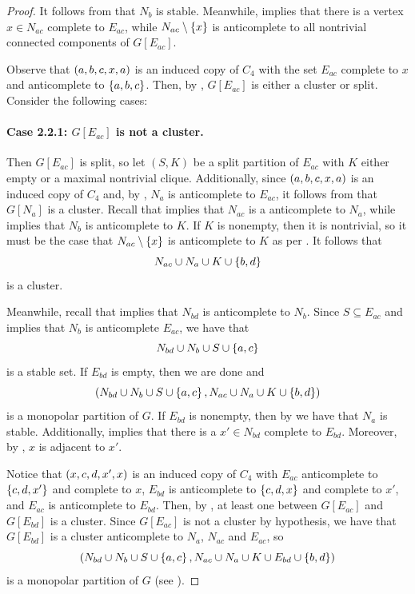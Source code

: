 \begin{proof}
    It follows from  that $N_b$ is stable. Meanwhile,
     implies that there is a vertex $x\in N_{ac}$ complete to $E_{ac}$,
    while $N_{ac}\setminus \left\{x\right\}$ is anticomplete to all nontrivial connected
    components of $G[E_{ac}]$.
    
    Observe that $\left(a,b,c,x,a\right)$ is an induced copy of $C_4$ with the set
    $E_{ac}$ complete to $x$ and anticomplete to $\left\{a,b,c\right\}$. Then, by
    , $G[E_{ac}]$ is either a cluster or split. Consider the
    following cases:

    \paragraph{Case 2.2.1: $G[E_{ac}]$ is not a cluster.} Then $G[E_{ac}]$ is
    split, so let $(S,K)$ be a split partition of $E_{ac}$ with $K$ either empty
    or a maximal nontrivial clique. Additionally, since $\left(a,b,c,x,a\right)$ is an
    induced copy of $C_4$ and, by , $N_{a}$ is anticomplete to
    $E_{ac}$, it follows from  that $G[N_a]$ is a cluster.
    Recall that  implies that $N_{ac}$ is a anticomplete to
    $N_a$, while  implies that $N_{b}$ is anticomplete to $K$.
    If $K$ is nonempty, then it is nontrivial, so it must be the case that
    $N_{ac} \setminus \left\{x\right\}$ is anticomplete to $K$ as per .
    It follows that
    \[
        N_{ac} \cup N_a \cup K \cup \left\{b,d\right\}
    \]
    is a cluster.

    Meanwhile, recall that  implies that $N_{bd}$ is
    anticomplete to $N_b$. Since $S\subseteq E_{ac}$ and 
    implies that $N_{b}$ is anticomplete $E_{ac}$, we have that
    \[
        N_{bd} \cup N_b \cup S \cup \left\{a,c\right\}
    \]
    is a stable set. If $E_{bd}$ is empty, then we are done and
    \[
        \left(N_{bd} \cup N_b \cup S  \cup \left\{a,c\right\}, N_{ac} \cup N_a \cup K
        \cup \left\{b,d\right\}\right)
    \]
    is a monopolar partition of $G$. If $E_{bd}$ is nonempty, then by
     we have that $N_a$ is stable. Additionally,
     implies that there is a $x'\in N_{bd}$ complete to
    $E_{bd}$. Moreover, by , $x$ is adjacent to $x'$.

    Notice that $\left(x,c,d,x',x\right)$ is an induced copy of $C_4$ with $E_{ac}$
    anticomplete to $\left\{c,d,x'\right\}$ and complete to $x$, $E_{bd}$ is anticomplete
    to $\left\{c,d,x\right\}$ and complete to $x'$, and $E_{ac}$ is anticomplete to
    $E_{bd}$. Then, by , at least one between $G[E_{ac}]$ and
    $G[E_{bd}]$ is a cluster. Since $G[E_{ac}]$ is not a cluster by hypothesis,
    we have that $G[E_{bd}]$ is a cluster anticomplete to $N_a$, $N_{ac}$ and
    $E_{ac}$, so
    \[
        \left(N_{bd} \cup N_b \cup S  \cup \left\{a,c\right\}, N_{ac} \cup N_a \cup K \cup E_{bd}
        \cup \left\{b,d\right\}\right)
    \]
    is a monopolar partition of $G$ (see
    ).


\end{proof}
